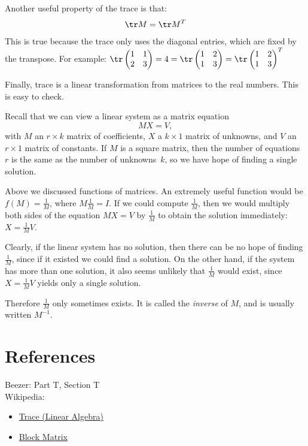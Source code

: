 Another useful property of the trace is that:
\[\tr M = \tr M^T\] 
This is true because the trace only uses the diagonal entries, which are fixed by the transpose.  For example:
$\tr \begin{pmatrix}
1 & 1 \\
2 & 3 \\
\end{pmatrix} = 4 = \tr \begin{pmatrix}
1 & 2 \\
1 & 3 \\
\end{pmatrix} = \tr \begin{pmatrix}
1 & 2 \\
1 & 3 \\
\end{pmatrix}^T
$

Finally, trace is a linear transformation from matrices to the real numbers.  This is easy to check.


\begin{remark}

Recall that we can view a linear system as a matrix equation
\[MX=V,\] 
with $M$ an $r\times k$ matrix of coefficients, $X$ a $k\times 1$ matrix of unknowns, and $V$ an $r\times 1$ matrix of constants.  If $M$ is a square matrix, then the number of equations~$r$ is the same as the number of unknowns~$k$, so we have hope of finding a single solution.

Above we discussed functions of matrices.  An extremely useful function would be $f(M)=\frac{1}{M}$, where $M\frac{1}{M}=I$.  If we could compute $\frac{1}{M}$, then we would multiply both sides of the equation $MX=V$ by $\frac{1}{M}$ to obtain the solution immediately: $X=\frac{1}{M}V$.

Clearly, if the linear system has no solution, then there can be no hope of finding $\frac{1}{M}$, since if it existed we could find a solution.  On the other hand, if the system has more than one solution, it also seems unlikely that $\frac{1}{M}$ would exist, since $X=\frac{1}{M}V$ yields only a single solution.  

Therefore $\frac{1}{M}$ only sometimes exists.  It is called the \emph{inverse} of $M$, and is usually written $M^{-1}$.
\end{remark}


\section*{References}
Beezer: Part T, Section T
\\
Wikipedia:
\begin{itemize}
\item \href{http://en.wikipedia.org/wiki/Trace_(linear_algebra)}{Trace (Linear Algebra)}
\item \href{http://en.wikipedia.org/wiki/Block_matrix}{Block Matrix}
\end{itemize}


